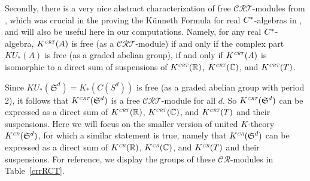 \documentclass[12pt, reqno]{amsart}
\theoremstyle{definition}
\def\R{{\mathbb R}}
\def\C{{\mathbb C}}
\def\crr{^{\scriptscriptstyle {\it CR}}}
\def\crt{^{\scriptscriptstyle {\it CRT}}}
\newcommand{\fS}{\mathfrak S}
\begin{document}
Secondly, there is a very nice abstract characterization of free $\mathcal{CRT}$-modules from \cite{bousfield90}, which was crucial in the proving the K\"unneth Formula for real $C \sp *$-algebras in \cite{Boer2002}, and will also be useful here in our computations. 
Namely, for any real $C \sp *$-algebra, $K\crt(A)$ is free (as a $\mathcal{CRT}$-module) if and only if the complex part $KU_*(A)$ is free (as a graded abelian group), if and only if $K\crt(A)$ is isomorphic to a direct sum of suspensions of $K\crt(\R)$, $K\crt(\C)$, and $K\crt(T)$. 

Since $KU_*(\fS^d) = K_*(C(S^d))$ is free (as a graded abelian group with period 2), it follows that $K\crt(\fS^d)$ is a free $\mathcal{CRT}$-module for all $d$. So
$K\crt(\fS^d)$ can be expressed as a direct sum of $K\crt(\R)$,  $K\crt(\C)$, and $K\crt(T)$ and their suspensions. Here we will focus on the smaller version of united $K$-theory $K\crr(\fS^d)$, for which a similar statement is true, namely that $K\crr(\fS^d)$ can be expressed as a direct sum of $K\crr(\R)$,  $K\crr(\C)$, and $K\crr(T)$ and their suspensions. For reference, we display the groups of these $\mathcal{CR}$-modules in Table~\ref{crrRCT}.
\end{document}
